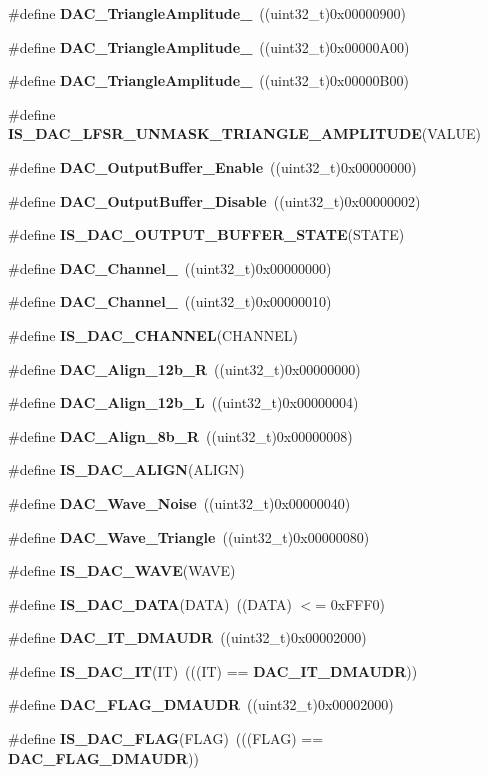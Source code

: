 \begin{DoxyCompactItemize}
\#define \textbf{ D\+A\+C\+\_\+\+Triangle\+Amplitude\+\_}~((uint32\+\_\+t)0x00000900)
\item 
\#define \textbf{ D\+A\+C\+\_\+\+Triangle\+Amplitude\+\_}~((uint32\+\_\+t)0x00000\+A00)
\item 
\#define \textbf{ D\+A\+C\+\_\+\+Triangle\+Amplitude\+\_}~((uint32\+\_\+t)0x00000\+B00)
\item 
\#define \textbf{ I\+S\+\_\+\+D\+A\+C\+\_\+\+L\+F\+S\+R\+\_\+\+U\+N\+M\+A\+S\+K\+\_\+\+T\+R\+I\+A\+N\+G\+L\+E\+\_\+\+A\+M\+P\+L\+I\+T\+U\+DE}(V\+A\+L\+UE)
\item 
\#define \textbf{ D\+A\+C\+\_\+\+Output\+Buffer\+\_\+\+Enable}~((uint32\+\_\+t)0x00000000)
\item 
\#define \textbf{ D\+A\+C\+\_\+\+Output\+Buffer\+\_\+\+Disable}~((uint32\+\_\+t)0x00000002)
\item 
\#define \textbf{ I\+S\+\_\+\+D\+A\+C\+\_\+\+O\+U\+T\+P\+U\+T\+\_\+\+B\+U\+F\+F\+E\+R\+\_\+\+S\+T\+A\+TE}(S\+T\+A\+TE)
\item 
\#define \textbf{ D\+A\+C\+\_\+\+Channel\+\_}~((uint32\+\_\+t)0x00000000)
\item 
\#define \textbf{ D\+A\+C\+\_\+\+Channel\+\_}~((uint32\+\_\+t)0x00000010)
\item 
\#define \textbf{ I\+S\+\_\+\+D\+A\+C\+\_\+\+C\+H\+A\+N\+N\+EL}(C\+H\+A\+N\+N\+EL)
\item 
\#define \textbf{ D\+A\+C\+\_\+\+Align\+\_\+12b\+\_\+R}~((uint32\+\_\+t)0x00000000)
\item 
\#define \textbf{ D\+A\+C\+\_\+\+Align\+\_\+12b\+\_\+L}~((uint32\+\_\+t)0x00000004)
\item 
\#define \textbf{ D\+A\+C\+\_\+\+Align\+\_\+8b\+\_\+R}~((uint32\+\_\+t)0x00000008)
\item 
\#define \textbf{ I\+S\+\_\+\+D\+A\+C\+\_\+\+A\+L\+I\+GN}(A\+L\+I\+GN)
\item 
\#define \textbf{ D\+A\+C\+\_\+\+Wave\+\_\+\+Noise}~((uint32\+\_\+t)0x00000040)
\item 
\#define \textbf{ D\+A\+C\+\_\+\+Wave\+\_\+\+Triangle}~((uint32\+\_\+t)0x00000080)
\item 
\#define \textbf{ I\+S\+\_\+\+D\+A\+C\+\_\+\+W\+A\+VE}(W\+A\+VE)
\item 
\#define \textbf{ I\+S\+\_\+\+D\+A\+C\+\_\+\+D\+A\+TA}(D\+A\+TA)~((D\+A\+TA) $<$= 0x\+F\+F\+F0)
\item 
\#define \textbf{ D\+A\+C\+\_\+\+I\+T\+\_\+\+D\+M\+A\+U\+DR}~((uint32\+\_\+t)0x00002000)
\item 
\#define \textbf{ I\+S\+\_\+\+D\+A\+C\+\_\+\+IT}(IT)~(((IT) == \textbf{ D\+A\+C\+\_\+\+I\+T\+\_\+\+D\+M\+A\+U\+DR}))
\item 
\#define \textbf{ D\+A\+C\+\_\+\+F\+L\+A\+G\+\_\+\+D\+M\+A\+U\+DR}~((uint32\+\_\+t)0x00002000)
\item 
\#define \textbf{ I\+S\+\_\+\+D\+A\+C\+\_\+\+F\+L\+AG}(F\+L\+AG)~(((F\+L\+AG) == \textbf{ D\+A\+C\+\_\+\+F\+L\+A\+G\+\_\+\+D\+M\+A\+U\+DR}))
\end{DoxyCompactItemize}
